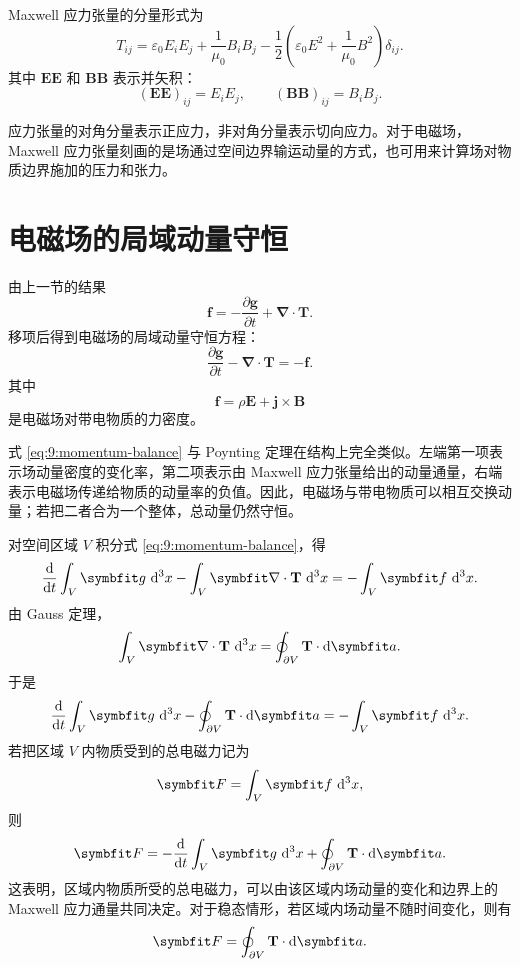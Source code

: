 Maxwell 应力张量的分量形式为
\begin{equation}
	T_{ij}
	=
	\varepsilon_{0}E_{i}E_{j}
	+
	\frac{1}{\mu_{0}}B_{i}B_{j}
	-
	\frac{1}{2}
	\left(
	\varepsilon_{0}E^{2}
	+
	\frac{1}{\mu_{0}}B^{2}
	\right)\delta_{ij}.
	\label{eq:9:maxwell-stress-components}
\end{equation}
其中 $\bm{E}\bm{E}$ 和 $\bm{B}\bm{B}$ 表示并矢积：
\[
(\bm{E}\bm{E})_{ij}
=
E_{i}E_{j},
\qquad
(\bm{B}\bm{B})_{ij}
=
B_{i}B_{j}.
\]

应力张量的对角分量表示正应力，非对角分量表示切向应力。对于电磁场，Maxwell 应力张量刻画的是场通过空间边界输运动量的方式，也可用来计算场对物质边界施加的压力和张力。

\section{电磁场的局域动量守恒}

由上一节的结果
\[
\bm{f}
=
-\frac{\partial\bm{g}}{\partial t}
+
\bm{\nabla}\cdot\mathbf T.
\]
移项后得到电磁场的局域动量守恒方程：
\begin{equation}
	\frac{\partial\bm{g}}{\partial t}
	-
	\bm{\nabla}\cdot\mathbf T
	=
	-\bm{f}.
	\label{eq:9:momentum-balance}
\end{equation}
其中
\[
\bm{f}
=
\rho\bm{E}
+
\bm{j}\times\bm{B}
\]
是电磁场对带电物质的力密度。

式 \eqref{eq:9:momentum-balance} 与 Poynting 定理在结构上完全类似。左端第一项表示场动量密度的变化率，第二项表示由 Maxwell 应力张量给出的动量通量，右端表示电磁场传递给物质的动量率的负值。因此，电磁场与带电物质可以相互交换动量；若把二者合为一个整体，总动量仍然守恒。

对空间区域 $V$ 积分式 \eqref{eq:9:momentum-balance}，得
\[
\frac{\dif}{\dif t}
\int_{V}\bm{g}\,\dif^{3}x
-
\int_{V}
\bm{\nabla}\cdot\mathbf T\,\dif^{3}x
=
-\int_{V}\bm{f}\,\dif^{3}x.
\]
由 Gauss 定理，
\[
\int_{V}
\bm{\nabla}\cdot\mathbf T\,\dif^{3}x
=
\oint_{\partial V}
\mathbf T\cdot\dif\bm{a}.
\]
于是
\begin{equation}
	\frac{\dif}{\dif t}
	\int_{V}\bm{g}\,\dif^{3}x
	-
	\oint_{\partial V}
	\mathbf T\cdot\dif\bm{a}
	=
	-\int_{V}\bm{f}\,\dif^{3}x.
	\label{eq:9:momentum-integral}
\end{equation}
若把区域 $V$ 内物质受到的总电磁力记为
\[
\bm{F}
=
\int_{V}\bm{f}\,\dif^{3}x,
\]
则
\[
\bm{F}
=
-\frac{\dif}{\dif t}
\int_{V}\bm{g}\,\dif^{3}x
+
\oint_{\partial V}
\mathbf T\cdot\dif\bm{a}.
\]
这表明，区域内物质所受的总电磁力，可以由该区域内场动量的变化和边界上的 Maxwell 应力通量共同决定。对于稳态情形，若区域内场动量不随时间变化，则有
\[
\bm{F}
=
\oint_{\partial V}
\mathbf T\cdot\dif\bm{a}.
\]


